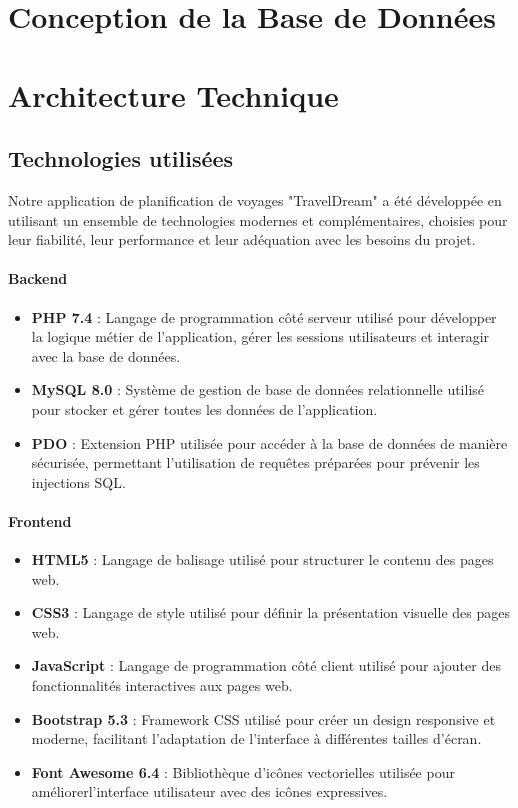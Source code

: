 \documentclass[a4paper,12pt]{article}
\begin{document}
\section{Conception de la Base de Données}
\section{Architecture Technique}

\subsection{Technologies utilisées}
Notre application de planification de voyages "TravelDream" a été développée en utilisant un ensemble de technologies modernes et complémentaires, choisies pour leur fiabilité, leur performance et leur adéquation avec les besoins du projet.

\paragraph{Backend}
\begin{itemize}
    \item \textbf{PHP 7.4} : Langage de programmation côté serveur utilisé pour développer la logique métier de l'application, gérer les sessions utilisateurs et interagir avec la base de données.
    \item \textbf{MySQL 8.0} : Système de gestion de base de données relationnelle utilisé pour stocker et gérer toutes les données de l'application.
    \item \textbf{PDO} : Extension PHP utilisée pour accéder à la base de
données de manière sécurisée, permettant l'utilisation de requêtes préparées pour prévenir les injections SQL.
\end{itemize}

\paragraph{Frontend}
\begin{itemize}
    \item \textbf{HTML5} : Langage de balisage utilisé pour structurer le contenu des pages web.
    \item \textbf{CSS3} : Langage de style utilisé pour définir la présentation visuelle des pages web.
    \item \textbf{JavaScript} : Langage de programmation côté client utilisé pour ajouter des fonctionnalités interactives aux pages web.
    \item \textbf{Bootstrap 5.3} : Framework CSS utilisé pour créer un design responsive et moderne, facilitant l'adaptation de l'interface à différentes tailles d'écran.
    \item \textbf{Font Awesome 6.4} : Bibliothèque d'icônes vectorielles utilisée pour améliorerl'interface utilisateur avec des icônes expressives.
\end{itemize}
\end{document}
